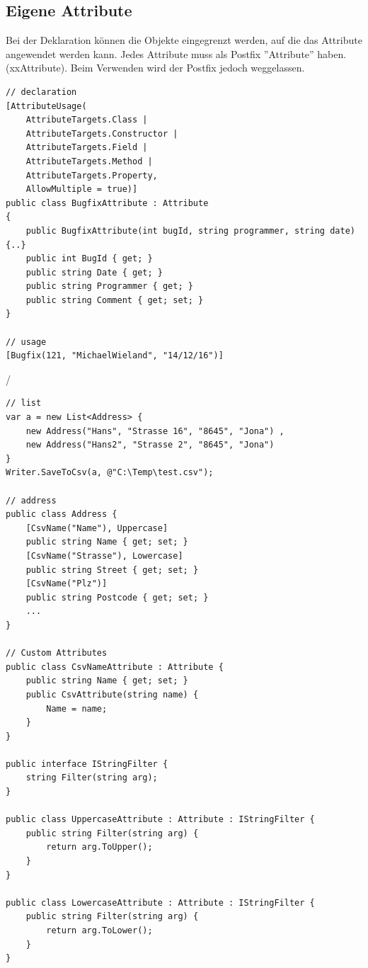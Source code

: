 \documentclass[
a4paper,
oneside,
10pt,
fleqn,
headsepline,
toc=listofnumbered, 
bibliography=totocnumbered]{scrartcl}
\begin{document}
\clearpage

\subsection{Eigene Attribute}
Bei der Deklaration können die Objekte eingegrenzt werden, auf die das Attribute angewendet werden kann. Jedes Attribute muss als Postfix ''Attribute'' haben. (xxAttribute). Beim Verwenden wird der Postfix jedoch weggelassen.
\begin{lstlisting}[caption=Custom Attributes]
// declaration
[AttributeUsage(
	AttributeTargets.Class |
	AttributeTargets.Constructor |
	AttributeTargets.Field |
	AttributeTargets.Method |
	AttributeTargets.Property,
	AllowMultiple = true)]
public class BugfixAttribute : Attribute
{
	public BugfixAttribute(int bugId, string programmer, string date) {..}
	public int BugId { get; }
	public string Date { get; }
	public string Programmer { get; }
	public string Comment { get; set; }
}

// usage
[Bugfix(121, "MichaelWieland", "14/12/16")]
\end{lstlisting}/

\begin{lstlisting}[caption=CSV Filter]
// list
var a = new List<Address> {
	new Address("Hans", "Strasse 16", "8645", "Jona") ,
	new Address("Hans2", "Strasse 2", "8645", "Jona")
}
Writer.SaveToCsv(a, @"C:\Temp\test.csv");

// address
public class Address {
	[CsvName("Name"), Uppercase]
	public string Name { get; set; }
	[CsvName("Strasse"), Lowercase]
	public string Street { get; set; }
	[CsvName("Plz")]
	public string Postcode { get; set; }
	...
}

// Custom Attributes
public class CsvNameAttribute : Attribute {
	public string Name { get; set; }
	public CsvAttribute(string name) {
		Name = name;
	}
}

public interface IStringFilter {
	string Filter(string arg); 
}

public class UppercaseAttribute : Attribute : IStringFilter {
	public string Filter(string arg) {
		return arg.ToUpper();
	}
}

public class LowercaseAttribute : Attribute : IStringFilter {
	public string Filter(string arg) {
		return arg.ToLower();
	}
}
\end{lstlisting}


\end{document}
